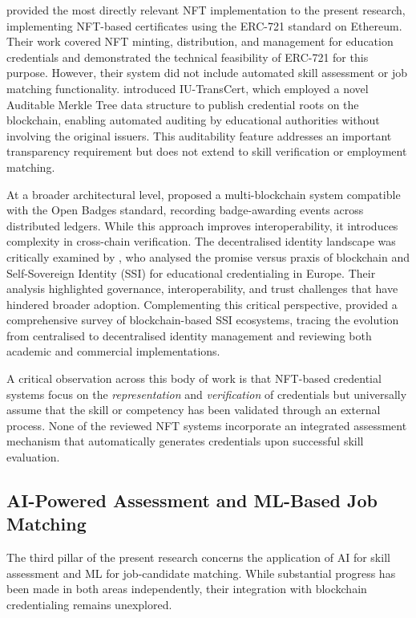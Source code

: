\citet{Aung2024} provided the most directly relevant NFT implementation to the present research, implementing NFT-based certificates using the ERC-721 standard on Ethereum. Their work covered NFT minting, distribution, and management for education credentials and demonstrated the technical feasibility of ERC-721 for this purpose. However, their system did not include automated skill assessment or job matching functionality. \citet{Le2023} introduced IU-TransCert, which employed a novel Auditable Merkle Tree data structure to publish credential roots on the blockchain, enabling automated auditing by educational authorities without involving the original issuers. This auditability feature addresses an important transparency requirement but does not extend to skill verification or employment matching.

At a broader architectural level, \citet{Tepelidis2023} proposed a multi-blockchain system compatible with the Open Badges standard, recording badge-awarding events across distributed ledgers. While this approach improves interoperability, it introduces complexity in cross-chain verification. The decentralised identity landscape was critically examined by \citet{Grech2021}, who analysed the promise versus praxis of blockchain and Self-Sovereign Identity (SSI) for educational credentialing in Europe. Their analysis highlighted governance, interoperability, and trust challenges that have hindered broader adoption. Complementing this critical perspective, \citet{Ahmed2022} provided a comprehensive survey of blockchain-based SSI ecosystems, tracing the evolution from centralised to decentralised identity management and reviewing both academic and commercial implementations.

A critical observation across this body of work is that NFT-based credential systems focus on the \textit{representation} and \textit{verification} of credentials but universally assume that the skill or competency has been validated through an external process. None of the reviewed NFT systems incorporate an integrated assessment mechanism that automatically generates credentials upon successful skill evaluation.

\subsection{AI-Powered Assessment and ML-Based Job Matching}
\label{sec:AIMLMatching}

The third pillar of the present research concerns the application of AI for skill assessment and ML for job-candidate matching. While substantial progress has been made in both areas independently, their integration with blockchain credentialing remains unexplored.

